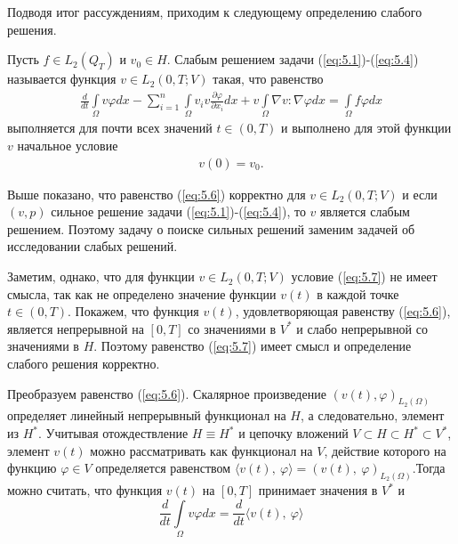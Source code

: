Подводя итог рассуждениям, приходим к следующему определению слабого решения.
\begin{definition}
    Пусть $f\in L_2(Q_T)$ и $v_0\in H$. Слабым решением задачи (\ref{eq:5.1})-(\ref{eq:5.4}) называется функция $v\in L_2(0, T;V)$ такая, что равенство
    \begin{equation}\label{eq:5.6}
        \begin{gathered}
            \frac{d}{dt}\int\limits_\Omega v \varphi dx-\sum_{i=1}^{n}\int\limits_\Omega v_i v
            \frac{\partial \varphi }{\partial x_i}dx + v\int\limits_\Omega \nabla v :\nabla\varphi dx=
            \int\limits_\Omega f \varphi dx
        \end{gathered}
    \end{equation}
    выполняется для почти всех значений $t \in (0, T)$ и выполнено для этой функции $v$ начальное условие
    \begin{equation}\label{eq:5.7}
        \begin{gathered}
            v(0) = v_0.
        \end{gathered}
    \end{equation}
\end{definition}

Выше показано, что равенство (\ref{eq:5.6}) корректно для $v \in L_2(0, T; V)$ и если $(v, p)$ сильное решение задачи (\ref{eq:5.1})-(\ref{eq:5.4}),
то $v$ является слабым решением. Поэтому задачу о поиске сильных решений заменим задачей об исследовании слабых решений.

Заметим, однако, что для функции $v \in L_2(0, T; V)$ условие (\ref{eq:5.7}) не имеет смысла, так как не определено значение функции $v(t)$ в каждой точке
$t \in (0, T)$. Покажем, что функция $v(t)$, удовлетворяющая равенству (\ref{eq:5.6}), является непрерывной на $[0, T]$ со значениями в $V^\ast$ и слабо
непрерывной со значениями в $H$. Поэтому равенство (\ref{eq:5.7}) имеет смысл и определение слабого решения корректно.

Преобразуем равенство (\ref{eq:5.6}). Скалярное произведение $(v(t), \varphi)_{L_2(\Omega)}$ определяет линейный непрерывный функционал на $H$, а следовательно,
элемент из $H^\ast$. Учитывая отождествление $H \equiv H^\ast$ и цепочку вложений $V \subset H \subset H^\ast \subset V^\ast$,
элемент $v(t)$ можно рассматривать как функционал на $V$, действие которого на функцию $\varphi \in V$ определяется равенством 
$\langle v(t), \ \varphi \rangle = (v(t), \ \varphi)_{L_2(\Omega)}$.Тогда можно считать, что функция $v(t)$ на $[0, T]$ принимает значения в $V^\ast$ и
$$\frac{d}{dt}\int\limits_\Omega v \varphi dx=\frac{d}{dt}\langle v(t), \ \varphi \rangle$$


